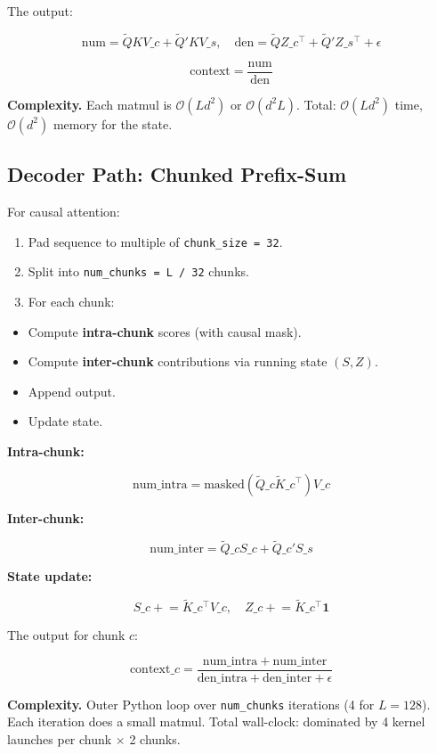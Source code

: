 The output:

\[
\text{num} = \tilde{Q} KV\_c + \tilde{Q}' KV\_s, \quad
\text{den} = \tilde{Q} Z\_c^\top + \tilde{Q}' Z\_s^\top + \epsilon
\]

\[
\text{context} = \frac{\text{num}}{\text{den}}
\]

\textbf{Complexity.} Each matmul is $\mathcal{O}(L d^2)$ or $\mathcal{O}(d^2 L)$. 
Total: $\mathcal{O}(L d^2)$ time, $\mathcal{O}(d^2)$ memory for the state.

\subsection{Decoder Path: Chunked Prefix-Sum}

For causal attention:

\begin{enumerate}
\item Pad sequence to multiple of \texttt{chunk\_size = 32}.
\item Split into \texttt{num\_chunks = L / 32} chunks.
\item For each chunk:
\end{enumerate}
\begin{itemize}
\item Compute \textbf{intra-chunk} scores (with causal mask).
\item Compute \textbf{inter-chunk} contributions via running state $(S, Z)$.
\item Append output.
\item Update state.

\end{itemize}
\textbf{Intra-chunk:}

\[
\text{num}\_\text{intra} = \text{masked}(\tilde{Q}\_c \tilde{K}\_c^\top) V\_c
\]

\textbf{Inter-chunk:}

\[
\text{num}\_\text{inter} = \tilde{Q}\_c S\_c + \tilde{Q}\_c' S\_s
\]

\textbf{State update:}

\[
S\_c \mathrel{+}= \tilde{K}\_c^\top V\_c, \quad
Z\_c \mathrel{+}= \tilde{K}\_c^\top \mathbf{1}
\]

The output for chunk $c$:

\[
\text{context}\_c = \frac{\text{num}\_\text{intra} + \text{num}\_\text{inter}}{\text{den}\_\text{intra} + \text{den}\_\text{inter} + \epsilon}
\]

\textbf{Complexity.} Outer Python loop over \texttt{num\_chunks} iterations (4 for $L = 128$). 
Each iteration does a small matmul. Total wall-clock: dominated by 4 kernel 
launches per chunk $\times$ 2 chunks.


